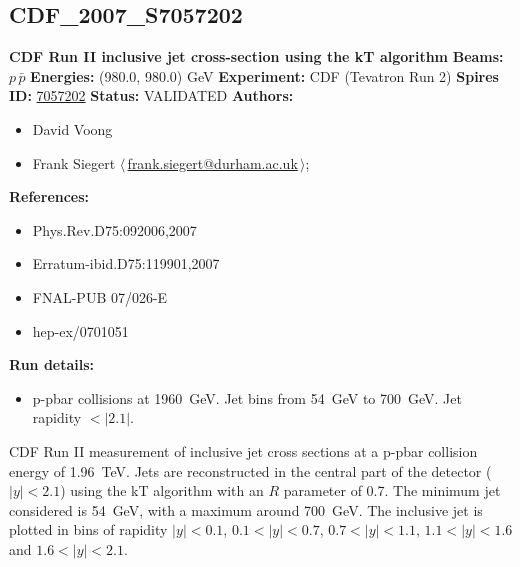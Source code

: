 \subsection[CDF\_2007\_S7057202]{CDF\_2007\_S7057202\,\cite{Abulencia:2007ez}}
\textbf{CDF Run II inclusive jet cross-section using the kT algorithm}\newline
\textbf{Beams:} $p$\,$\bar{p}$ \newline
\textbf{Energies:} (980.0, 980.0) GeV \newline
\textbf{Experiment:} CDF (Tevatron Run 2) \newline
\textbf{Spires ID:} \href{http://www.slac.stanford.edu/spires/find/hep/www?rawcmd=key+7057202}{7057202}\newline
\textbf{Status:} VALIDATED\newline
\textbf{Authors:}
\begin{itemize}
  \item David Voong
  \item Frank Siegert $\langle\,$\href{mailto:frank.siegert@durham.ac.uk}{frank.siegert@durham.ac.uk}$\,\rangle$;
\end{itemize}
\textbf{References:}
\begin{itemize}
  \item Phys.Rev.D75:092006,2007
  \item Erratum-ibid.D75:119901,2007
  \item FNAL-PUB 07/026-E
  \item hep-ex/0701051
\end{itemize}
\textbf{Run details:}
\begin{itemize}

  \item p-pbar collisions at 1960~GeV. Jet \pT bins from 54~GeV to 700~GeV. Jet rapidity $< |2.1|$.\end{itemize}

\noindent CDF Run II measurement of inclusive jet cross sections at a p-pbar collision energy of 1.96~TeV. Jets are reconstructed in the central part of the detector ($|y|<2.1$) using the kT algorithm with an $R$ parameter of 0.7. The minimum jet \pT considered is 54~GeV, with a maximum around 700~GeV.  The inclusive jet \pT is plotted in bins of rapidity $|y|<0.1$, $0.1<|y|<0.7$, $0.7<|y|<1.1$, $1.1<|y|<1.6$ and $1.6<|y|<2.1$.

\clearpage


\clearpage

